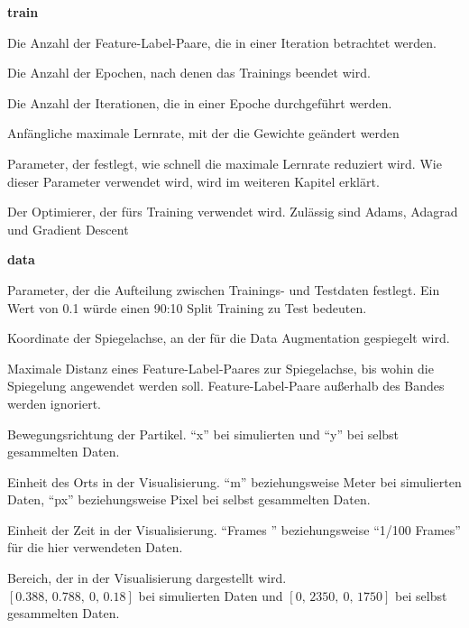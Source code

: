 \newpage
{\Large \sffamily \textbf{train}}

\begin{description}[leftmargin=!,labelwidth=\widthof{\bfseries separatorPosition}, labelindent=0.5cm]
    \item[batchSize] Die Anzahl der Feature-Label-Paare, die in einer Iteration betrachtet werden.
    \item[epochs] Die Anzahl der Epochen, nach denen das Trainings beendet wird.
    \item[stepsPerEpoch] Die Anzahl der Iterationen, die in einer Epoche durchgeführt werden.  
    \item[learningRate] Anfängliche maximale Lernrate, mit der die Gewichte geändert werden
    \item[decaySteps] Parameter, der festlegt, wie schnell die maximale Lernrate reduziert wird. Wie dieser Parameter verwendet wird, wird im weiteren Kapitel erklärt.
    \item[optimizer] Der Optimierer, der fürs Training verwendet wird. Zulässig sind Adams, Adagrad und Gradient Descent
\end{description}

\bigskip
{\Large \sffamily \textbf{data}}
\begin{description}[leftmargin=!,labelwidth=\widthof{\bfseries separatorPosition}, labelindent=0.5cm]
    \item[testSize] Parameter, der die Aufteilung zwischen Trainings- und Testdaten festlegt. Ein Wert von 0.1 würde einen 90:10 Split Training zu Test bedeuten.  
    \item[augmentMidpoint] Koordinate der Spiegelachse, an der für die Data Augmentation gespiegelt wird.
    \item[augmentRange] Maximale Distanz eines Feature-Label-Paares zur Spiegelachse, bis wohin die Spiegelung angewendet werden soll. Feature-Label-Paare außerhalb des Bandes werden ignoriert.
    \item[direction] Bewegungsrichtung der Partikel. ``x'' bei simulierten und ``y'' bei selbst gesammelten Daten.
    \item[unitLoc] Einheit des Orts in der Visualisierung. ``m'' beziehungsweise Meter bei simulierten Daten, ``px'' beziehungsweise Pixel bei selbst gesammelten Daten.
    \item[unitTime] Einheit der Zeit in der Visualisierung. ``Frames '' beziehungsweise ``1/100 Frames'' für die hier verwendeten Daten.
    \item[limits] Bereich, der in der Visualisierung dargestellt wird.\\ \([0.388, \, 0.788, \ 0, \, 0.18]\) bei simulierten Daten und \([0,\, 2350, \ 0, \, 1750]\) bei selbst gesammelten Daten.

\end{description}



